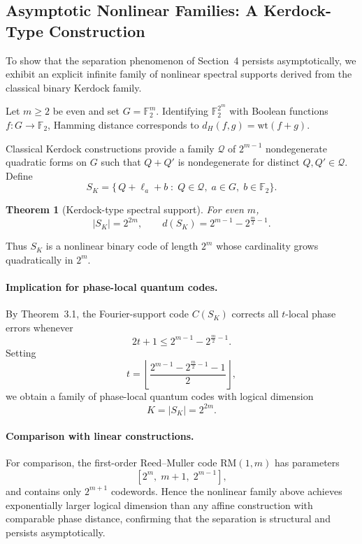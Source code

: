 \documentclass[a4paper,twocolumn,11pt,allowtoday]{quantumarticle}
\theoremstyle{plain}
\newtheorem{theorem}{Theorem}[section]
\theoremstyle{definition}
\theoremstyle{remark}
\begin{document}
\subsection{Asymptotic Nonlinear Families: A Kerdock-Type Construction}

To show that the separation phenomenon of Section~4 persists
asymptotically, we exhibit an explicit infinite family of nonlinear
spectral supports derived from the classical binary Kerdock family.

Let $m\ge 2$ be even and set $G=\mathbb{F}_2^m$.
Identifying $\mathbb{F}_2^{2^m}$ with Boolean functions
$f:G\to\mathbb{F}_2$, Hamming distance corresponds to
$d_H(f,g)=\mathrm{wt}(f+g)$.

Classical Kerdock constructions provide a family
$\mathcal{Q}$ of $2^{m-1}$ nondegenerate quadratic forms on $G$
such that $Q+Q'$ is nondegenerate for distinct $Q,Q'\in\mathcal{Q}$.
Define
\[
S_K=
\{\, Q+\ell_a+b
\;:\;
Q\in\mathcal{Q},\;
a\in G,\;
b\in\mathbb{F}_2
\}.
\]

\begin{theorem}[Kerdock-type spectral support]
For even $m$,
\[
|S_K|=2^{2m},
\qquad
d(S_K)=2^{m-1}-2^{\frac{m}{2}-1}.
\]
\end{theorem}

Thus $S_K$ is a nonlinear binary code of length $2^m$
whose cardinality grows quadratically in $2^m$.

\paragraph{Implication for phase-local quantum codes.}
By Theorem~3.1, the Fourier-support code $C(S_K)$
corrects all $t$-local phase errors whenever
\[
2t+1\le 2^{m-1}-2^{\frac{m}{2}-1}.
\]
Setting
\[
t=\left\lfloor
\frac{2^{m-1}-2^{\frac{m}{2}-1}-1}{2}
\right\rfloor,
\]
we obtain a family of phase-local quantum codes with logical dimension
\[
K=|S_K|=2^{2m}.
\]

\paragraph{Comparison with linear constructions.}
For comparison, the first-order Reed--Muller code
$\mathrm{RM}(1,m)$ has parameters
\[
[2^m,\; m+1,\; 2^{m-1}],
\]
and contains only $2^{m+1}$ codewords.
Hence the nonlinear family above achieves exponentially larger
logical dimension than any affine construction with comparable
phase distance, confirming that the separation is structural
and persists asymptotically.
\end{document}
